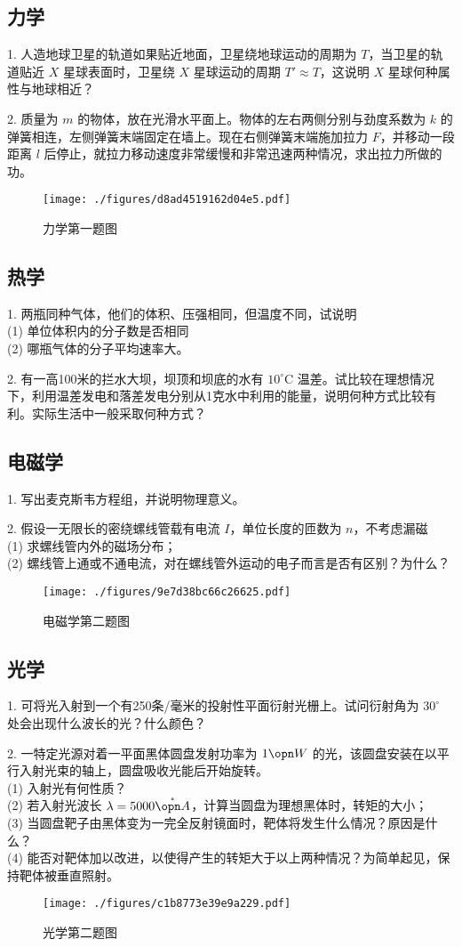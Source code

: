\subsection{力学}
1. 人造地球卫星的轨道如果贴近地面，卫星绕地球运动的周期为 $T$，当卫星的轨道贴近 $X$ 星球表面时，卫星绕 $X$ 星球运动的周期 $T' \approx T$，这说明 $X$ 星球何种属性与地球相近？

2. 质量为 $m$ 的物体，放在光滑水平面上。物体的左右两侧分别与劲度系数为 $k$ 的弹簧相连，左侧弹簧末端固定在墙上。现在右侧弹簧末端施加拉力 $F$，并移动一段距离 $l$ 后停止，就拉力移动速度非常缓慢和非常迅速两种情况，求出拉力所做的功。
\begin{figure}[ht]
\centering
\texttt{[image: ./figures/d8ad4519162d04e5.pdf]}
\caption{力学第一题图} \label{fig_NJU13_1}
\end{figure}
\subsection{热学}
1. 两瓶同种气体，他们的体积、压强相同，但温度不同，试说明\\
(1) 单位体积内的分子数是否相同\\
(2) 哪瓶气体的分子平均速率大。

2. 有一高100米的拦水大坝，坝顶和坝底的水有 $10^\circ\mathrm{C}$ 温差。试比较在理想情况下，利用温差发电和落差发电分别从1克水中利用的能量，说明何种方式比较有利。实际生活中一般采取何种方式？
\subsection{电磁学}
1. 写出麦克斯韦方程组，并说明物理意义。

2. 假设一无限长的密绕螺线管载有电流 $I$，单位长度的匝数为 $n$，不考虑漏磁\\
(1) 求螺线管内外的磁场分布；\\
(2) 螺线管上通或不通电流，对在螺线管外运动的电子而言是否有区别？为什么？
\begin{figure}[ht]
\centering
\texttt{[image: ./figures/9e7d38bc66c26625.pdf]}
\caption{电磁学第二题图} \label{fig_NJU13_2}
\end{figure}
\subsection{光学}
1. 可将光入射到一个有250条/毫米的投射性平面衍射光栅上。试问衍射角为 $30^\circ$ 处会出现什么波长的光？什么颜色？

2. 一特定光源对着一平面黑体圆盘发射功率为 $1\opn W$ 的光，该圆盘安装在以平行入射光束的轴上，圆盘吸收光能后开始旋转。\\
(1) 入射光有何性质？\\
(2) 若入射光波长 $\lambda=5000 \mathring{\opn A}$，计算当圆盘为理想黑体时，转矩的大小；\\
(3) 当圆盘靶子由黑体变为一完全反射镜面时，靶体将发生什么情况？原因是什么？\\
(4) 能否对靶体加以改进，以使得产生的转矩大于以上两种情况？为简单起见，保持靶体被垂直照射。
\begin{figure}[ht]
\centering
\texttt{[image: ./figures/c1b8773e39e9a229.pdf]}
\caption{光学第二题图} \label{fig_NJU13_3}
\end{figure}
